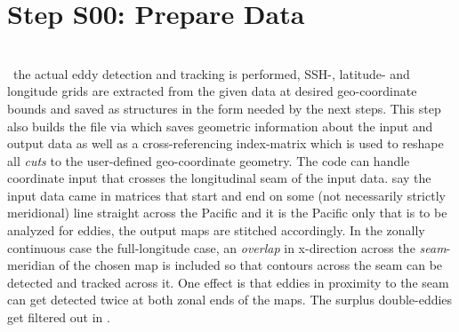 \section[Data Preparation]{Step S00: Prepare Data}
	\\
~the actual eddy detection and tracking is performed,  SSH-, latitude- and longitude grids are extracted from the given data at desired geo-coordinate bounds and saved as structures in the form needed by the next steps. This step also builds the file  via  which saves geometric information about the input and output data as well as a cross-referencing index-matrix which is used to reshape all \textit{cuts} to the user-defined geo-coordinate geometry. The code can handle coordinate input that crosses the longitudinal seam of
the input data. \Eg say the input data came in matrices that start and end on
some (not necessarily strictly meridional) line straight across the Pacific and
it is the Pacific only that is to be analyzed for eddies, the output maps are
stitched accordingly. In the zonally continuous case \ie the full-longitude case, an \textit{overlap} in x-direction across the \textit{seam}-meridian of the chosen map is included so that contours across the seam can be detected and tracked across it. One effect is that eddies in proximity to the seam can get detected twice at both zonal ends of the maps. The surplus double-eddies get filtered out in .

